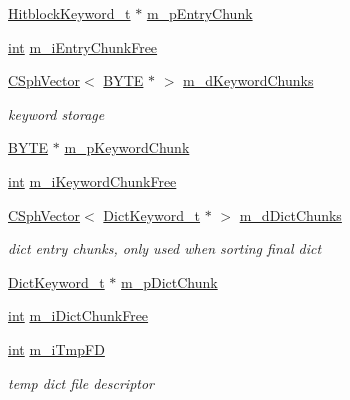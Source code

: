 \begin{DoxyCompactItemize}
\hyperlink{structCSphDictKeywords_1_1HitblockKeyword__t}{Hitblock\-Keyword\-\_\-t} $\ast$ \hyperlink{classCSphDictKeywords_a12f05f6c94bf83311bddbbc6691f9565}{m\-\_\-p\-Entry\-Chunk}
\item 
\hyperlink{sphinxexpr_8cpp_a4a26e8f9cb8b736e0c4cbf4d16de985e}{int} \hyperlink{classCSphDictKeywords_acfa363c4f4c8e4c8feebbc09332ef2e4}{m\-\_\-i\-Entry\-Chunk\-Free}
\item 
\hyperlink{classCSphVector}{C\-Sph\-Vector}$<$ \hyperlink{sphinxstd_8h_a4ae1dab0fb4b072a66584546209e7d58}{B\-Y\-T\-E} $\ast$ $>$ \hyperlink{classCSphDictKeywords_a2f573557f042bc7bfc069b21b2c9fa1c}{m\-\_\-d\-Keyword\-Chunks}
\begin{DoxyCompactList}\small\item\em keyword storage \end{DoxyCompactList}\item 
\hyperlink{sphinxstd_8h_a4ae1dab0fb4b072a66584546209e7d58}{B\-Y\-T\-E} $\ast$ \hyperlink{classCSphDictKeywords_ac470e170cd907d141f37d5210efbc119}{m\-\_\-p\-Keyword\-Chunk}
\item 
\hyperlink{sphinxexpr_8cpp_a4a26e8f9cb8b736e0c4cbf4d16de985e}{int} \hyperlink{classCSphDictKeywords_a954a442142b5635312c9914f874390f3}{m\-\_\-i\-Keyword\-Chunk\-Free}
\item 
\hyperlink{classCSphVector}{C\-Sph\-Vector}$<$ \hyperlink{structCSphDictKeywords_1_1DictKeyword__t}{Dict\-Keyword\-\_\-t} $\ast$ $>$ \hyperlink{classCSphDictKeywords_a057492051773da1dc28351efaf14fb28}{m\-\_\-d\-Dict\-Chunks}
\begin{DoxyCompactList}\small\item\em dict entry chunks, only used when sorting final dict \end{DoxyCompactList}\item 
\hyperlink{structCSphDictKeywords_1_1DictKeyword__t}{Dict\-Keyword\-\_\-t} $\ast$ \hyperlink{classCSphDictKeywords_ac4a783763cff892ddb1374d0b660fe8e}{m\-\_\-p\-Dict\-Chunk}
\item 
\hyperlink{sphinxexpr_8cpp_a4a26e8f9cb8b736e0c4cbf4d16de985e}{int} \hyperlink{classCSphDictKeywords_a6b1fa8fc0bacf8fbcd1f5bfef141ba01}{m\-\_\-i\-Dict\-Chunk\-Free}
\item 
\hyperlink{sphinxexpr_8cpp_a4a26e8f9cb8b736e0c4cbf4d16de985e}{int} \hyperlink{classCSphDictKeywords_a68707efef4729652343aee550d57a3b6}{m\-\_\-i\-Tmp\-F\-D}
\begin{DoxyCompactList}\small\item\em temp dict file descriptor \end{DoxyCompactList}\item 

\end{DoxyCompactItemize}
